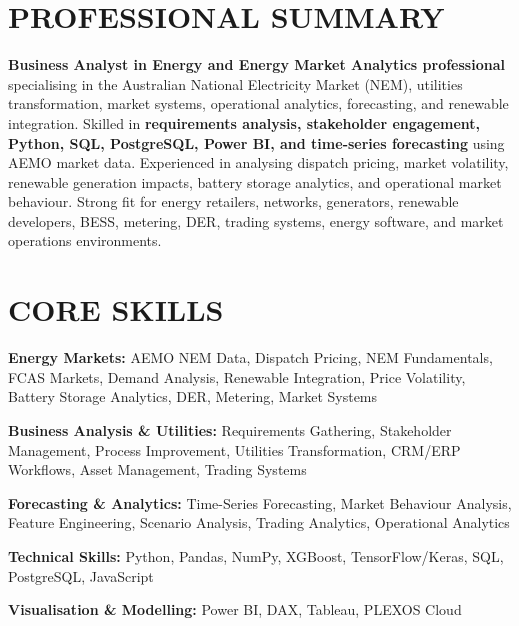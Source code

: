 \documentclass[10pt,a4paper]{article}
\begin{document}
\vspace{6pt}


\section{PROFESSIONAL SUMMARY}

\color{TextGray}

\textbf{Business Analyst in Energy and Energy Market Analytics professional} specialising in the Australian National Electricity Market (NEM), utilities transformation, market systems, operational analytics, forecasting, and renewable integration. Skilled in \textbf{requirements analysis, stakeholder engagement, Python, SQL, PostgreSQL, Power BI, and time-series forecasting} using AEMO market data. Experienced in analysing dispatch pricing, market volatility, renewable generation impacts, battery storage analytics, and operational market behaviour. Strong fit for energy retailers, networks, generators, renewable developers, BESS, metering, DER, trading systems, energy software, and market operations environments.


\section{CORE SKILLS}

\begin{tcolorbox}[
colback=SoftBg,
colframe=SoftLine,
arc=3pt,
boxrule=0.5pt,
left=10pt,
right=10pt,
top=8pt,
bottom=8pt
]

\textbf{\color{Primary} Energy Markets:}
AEMO NEM Data, Dispatch Pricing, NEM Fundamentals, FCAS Markets, Demand Analysis, Renewable Integration, Price Volatility, Battery Storage Analytics, DER, Metering, Market Systems

\vspace{6pt}

\textbf{\color{Primary} Business Analysis \& Utilities:}
Requirements Gathering, Stakeholder Management, Process Improvement, Utilities Transformation, CRM/ERP Workflows, Asset Management, Trading Systems

\vspace{6pt}

\textbf{\color{Primary} Forecasting \& Analytics:}
Time-Series Forecasting, Market Behaviour Analysis, Feature Engineering, Scenario Analysis, Trading Analytics, Operational Analytics

\vspace{6pt}

\textbf{\color{Primary} Technical Skills:}
Python, Pandas, NumPy, XGBoost, TensorFlow/Keras, SQL, PostgreSQL, JavaScript

\vspace{6pt}

\textbf{\color{Primary} Visualisation \& Modelling:}
Power BI, DAX, Tableau, PLEXOS Cloud

\end{tcolorbox}
\end{document}
